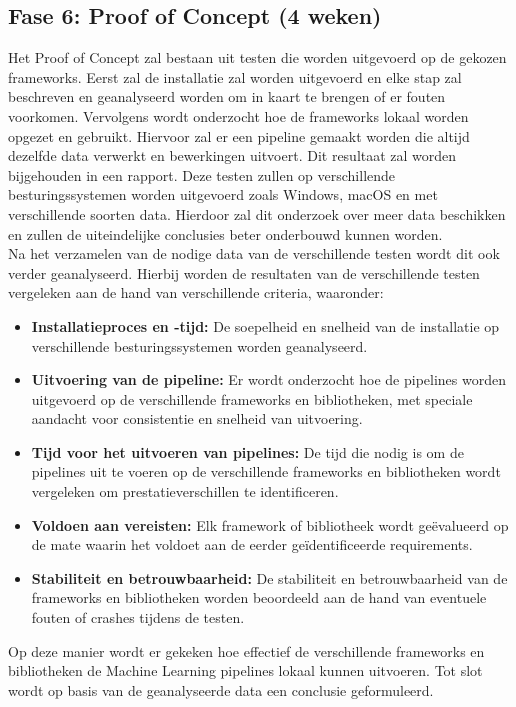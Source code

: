 \subsection{Fase 6: Proof of Concept (4 weken)}
Het Proof of Concept zal bestaan uit testen die worden uitgevoerd op de gekozen frameworks. Eerst zal de installatie zal worden uitgevoerd en elke stap zal beschreven en geanalyseerd worden om in kaart te brengen of er fouten voorkomen. Vervolgens wordt onderzocht hoe de frameworks lokaal worden opgezet en gebruikt. Hiervoor zal er een pipeline gemaakt worden die altijd dezelfde data verwerkt en bewerkingen uitvoert. Dit resultaat zal worden bijgehouden in een rapport.
Deze testen zullen op verschillende besturingssystemen worden uitgevoerd zoals Windows, macOS en met verschillende soorten data. Hierdoor zal dit onderzoek over meer data beschikken en zullen de uiteindelijke conclusies beter onderbouwd kunnen worden.\\
Na het verzamelen van de nodige data van de verschillende testen wordt dit ook verder geanalyseerd. Hierbij worden de resultaten van de verschillende testen vergeleken aan de hand van verschillende criteria, waaronder:
\begin{itemize}
  \item \textbf{Installatieproces en -tijd:} De soepelheid en snelheid van de installatie op verschillende besturingssystemen worden geanalyseerd.
  \item \textbf{Uitvoering van de pipeline:} Er wordt onderzocht hoe de pipelines worden uitgevoerd op de verschillende frameworks en bibliotheken, met speciale aandacht voor consistentie en snelheid van uitvoering.
  \item \textbf{Tijd voor het uitvoeren van pipelines:} De tijd die nodig is om de pipelines uit te voeren op de verschillende frameworks en bibliotheken wordt vergeleken om prestatieverschillen te identificeren.
  \item \textbf{Voldoen aan vereisten:} Elk framework of bibliotheek wordt geëvalueerd op de mate waarin het voldoet aan de eerder geïdentificeerde requirements.
  \item \textbf{Stabiliteit en betrouwbaarheid:} De stabiliteit en betrouwbaarheid van de frameworks en bibliotheken worden beoordeeld aan de hand van eventuele fouten of crashes tijdens de testen.
\end{itemize}
Op deze manier wordt er gekeken hoe effectief de verschillende frameworks en bibliotheken de Machine Learning pipelines lokaal kunnen uitvoeren. Tot slot wordt op basis van de geanalyseerde data een conclusie geformuleerd.\\
